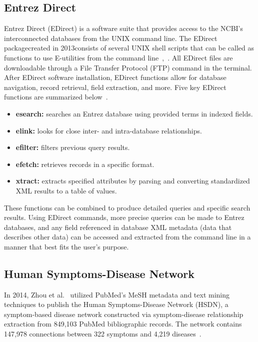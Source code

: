 \documentclass{IEEEtran}
\begin{document}
	\subsection{Entrez Direct}
	Entrez Direct (EDirect) is a software suite that provides access to the NCBI's interconnected databases from the UNIX command line.  The EDirect package\textemdash created in 2013\textemdash consists of several UNIX shell scripts that can be called as functions to use E-utilities from the command line~\cite{edirect14},~\cite{edirect17}.  All EDirect files are downloadable through a File Transfer Protocol (FTP) command in the terminal.  After EDirect software installation, EDirect functions allow for database navigation, record retrieval, field extraction, and more.  Five key EDirect functions are summarized below~\cite{edirect17}.
	\begin{itemize}
		\item \textbf{esearch:} searches an Entrez database using provided terms in indexed fields.
		\item \textbf{elink:} looks for close inter- and intra-database relationships.
		\item \textbf{efilter:} filters previous query results.
		\item \textbf{efetch:} retrieves records in a specific format.
		\item \textbf{xtract:} extracts specified attributes by parsing and converting standardized XML results to a table of values.
	\end{itemize}
	
	These functions can be combined to produce detailed queries and specific search results.  Using EDirect commands, more precise queries can be made to Entrez databases, and any field referenced in database XML metadata (data that describes other data) can be accessed and extracted from the command line in a manner that best fits the user's purpose.
	\subsection{Human Symptoms-Disease Network}
	In 2014, Zhou et al.~\cite{hsdn} utilized PubMed's MeSH metadata and text mining techniques to publish the Human Symptoms-Disease Network (HSDN), a symptom-based disease network constructed via symptom-disease relationship extraction from 849,103 PubMed bibliographic records. The network contains 147,978 connections between 322 symptoms and 4,219 diseases~\cite{hsdn}.
	
\end{document}
